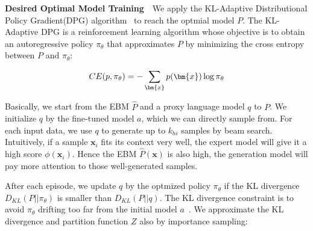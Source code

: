 
\noindent\textbf{Desired Optimal Model Training}~~We apply the KL-Adaptive Distributional Policy Gradient(DPG) algorithm~\citep{parshakova-etal-2019-global, 
dpg} to reach the optmial model $P$. The KL-Adaptive DPG is a reinforcement learning algorithm whose objective
is to obtain an autoregressive policy $\pi_\theta$ that approximates $P$ by minimizing the cross entropy
between $P$ and $\pi_\theta$:

\begin{equation}\label{ceppi}
    \small
    CE(p, \pi_\theta) = -\sum_{\bm{x}}p(\bm{x})\log \pi_\theta
\end{equation}

Basically, we start from the EBM $\hat{P}$ and a proxy language model $q$ to $P$. We initialize $q$ by the 
fine-tuned model $a$, which we can directly sample from. 
For each input data, we use $q$ to generate up to $\mathit{k_{bs}}$ samples by beam search. Intuitively, if a sample $\bm{x}_i$ 
fits its context very well, the expert model will give it
a high score $\phi(\bm{x}_i)$. Hence the EBM $\hat{P}(\bm{x})$ is also high, the generation model will pay more
attention to those well-generated samples.

After each episode, we update $q$ by the optmized policy $\pi_\theta$ if the KL divergence 
$D_{KL}(P||\pi_\theta)$ is smaller than $D_{KL}(P||q)$. 
The KL divergence constraint is to avoid
$\pi_\theta$ drifting too far from the initial model $a$~\citep{Ziegler, dpg}.
We approximate the KL divergence and partition function $Z$ also by importance sampling:

